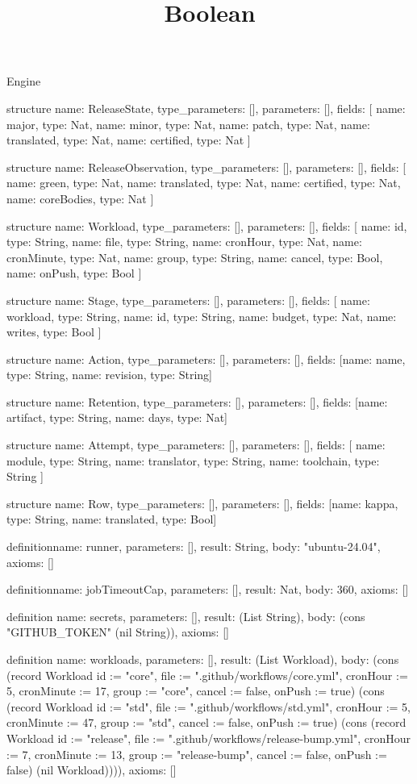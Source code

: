 \begin{lexlean}{Engine}
\title{Boolean}
\begin{semanticmodule}
structure{
  name: ReleaseState,
  type_parameters: [],
  parameters: [],
  fields: [
    {name: major, type: Nat},
    {name: minor, type: Nat},
    {name: patch, type: Nat},
    {name: translated, type: Nat},
    {name: certified, type: Nat}
  ]
}

structure{
  name: ReleaseObservation,
  type_parameters: [],
  parameters: [],
  fields: [
    {name: green, type: Nat},
    {name: translated, type: Nat},
    {name: certified, type: Nat},
    {name: coreBodies, type: Nat}
  ]
}

structure{
  name: Workload,
  type_parameters: [],
  parameters: [],
  fields: [
    {name: id, type: String},
    {name: file, type: String},
    {name: cronHour, type: Nat},
    {name: cronMinute, type: Nat},
    {name: group, type: String},
    {name: cancel, type: Bool},
    {name: onPush, type: Bool}
  ]
}

structure{
  name: Stage,
  type_parameters: [],
  parameters: [],
  fields: [
    {name: workload, type: String},
    {name: id, type: String},
    {name: budget, type: Nat},
    {name: writes, type: Bool}
  ]
}

structure{
  name: Action,
  type_parameters: [],
  parameters: [],
  fields: [{name: name, type: String}, {name: revision, type: String}]
}

structure{
  name: Retention,
  type_parameters: [],
  parameters: [],
  fields: [{name: artifact, type: String}, {name: days, type: Nat}]
}

structure{
  name: Attempt,
  type_parameters: [],
  parameters: [],
  fields: [
    {name: module, type: String},
    {name: translator, type: String},
    {name: toolchain, type: String}
  ]
}

structure{
  name: Row,
  type_parameters: [],
  parameters: [],
  fields: [{name: kappa, type: String}, {name: translated, type: Bool}]
}

definition{name: runner, parameters: [], result: String, body: "ubuntu-24.04", axioms: []}

definition{name: jobTimeoutCap, parameters: [], result: Nat, body: 360, axioms: []}

definition{
  name: secrets,
  parameters: [],
  result: (List String),
  body: (cons "GITHUB_TOKEN" (nil String)),
  axioms: []
}

definition{
  name: workloads,
  parameters: [],
  result: (List Workload),
  body: (cons (record Workload {id := "core", file := ".github/workflows/core.yml", cronHour := 5, cronMinute := 17, group := "core", cancel := false, onPush := true}) (cons (record Workload {id := "std", file := ".github/workflows/std.yml", cronHour := 5, cronMinute := 47, group := "std", cancel := false, onPush := true}) (cons (record Workload {id := "release", file := ".github/workflows/release-bump.yml", cronHour := 7, cronMinute := 13, group := "release-bump", cancel := false, onPush := false}) (nil Workload)))),
  axioms: []
}


\end{semanticmodule}
\end{lexlean}
